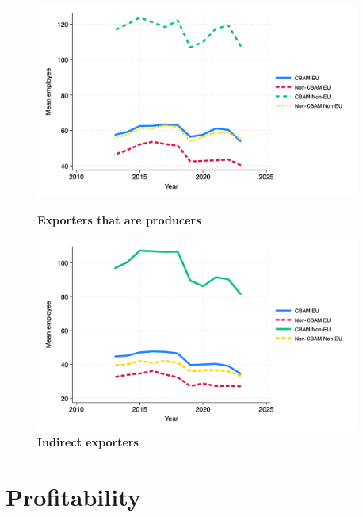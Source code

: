 \documentclass{article}
\begin{document}
\begin{figure}[H]
\centering
\includegraphics[width=0.95\textwidth]{employee_ep.png}
\caption{\textbf{Exporters that are producers}}
\includegraphics[width=0.95\textwidth]{employee_indir.png}
\caption{\textbf{Indirect exporters}}
\end{figure}

\section{Profitability}
\end{document}
